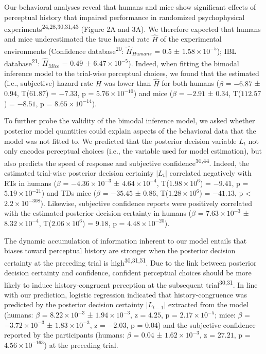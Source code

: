 \documentclass[
]{article}
\begin{document}
Our behavioral analyses reveal that humans and mice show significant
effects of perceptual history that impaired performance in randomized
psychophysical experiments\textsuperscript{24,28,30,31,43} (Figure 2A
and 3A). We therefore expected that humans and mice underestimated the
true hazard rate \(\hat{H}\) of the experimental environments
(Confidence database\textsuperscript{20}: \(\hat{H}_{Humans}\) = \(0.5\)
± \(\ensuremath{1.58\times 10^{-5}}\)); IBL
database\textsuperscript{21}: \(\hat{H}_{Mice}\) = \(0.49\) ±
\(\ensuremath{6.47\times 10^{-5}}\)). Indeed, when fitting the bimodal
inference model to the trial-wise perceptual choices, we found that the
estimated (i.e., subjective) hazard rate \(H\) was lower than
\(\hat{H}\) for both humans (\(\beta\) = \(-6.87\) ± \(0.94\),
T(\(61.87\)) = \(-7.33\), p = \(\ensuremath{5.76\times 10^{-10}}\)) and
mice (\(\beta\) = \(-2.91\) ± \(0.34\), T(\(112.57\)) = \(-8.51\), p =
\(\ensuremath{8.65\times 10^{-14}}\)).

To further probe the validity of the bimodal inference model, we asked
whether posterior model quantities could explain aspects of the
behavioral data that the model was not fitted to. We predicted that the
posterior decision variable \(L_t\) not only encodes perceptual choices
(i.e., the variable used for model estimation), but also predicts the
speed of response and subjective confidence\textsuperscript{30,44}.
Indeed, the estimated trial-wise posterior decision certainty \(|L_t|\)
correlated negatively with RTs in humans (\(\beta\) =
\(\ensuremath{-4.36\times 10^{-3}}\) ±
\(\ensuremath{4.64\times 10^{-4}}\),
T(\(\ensuremath{1.98\times 10^{6}}\)) = \(-9.41\), p =
\(\ensuremath{5.19\times 10^{-21}}\)) and TDs mice (\(\beta\) =
\(-35.45\) ± \(0.86\), T(\(\ensuremath{1.28\times 10^{6}}\)) =
\(-41.13\), p < \(\ensuremath{2.2\times 10^{-308}}\)). Likewise, subjective confidence reports were
positively correlated with the estimated posterior decision certainty in
humans (\(\beta\) = \(\ensuremath{7.63\times 10^{-3}}\) ±
\(\ensuremath{8.32\times 10^{-4}}\),
T(\(\ensuremath{2.06\times 10^{6}}\)) = \(9.18\), p =
\(\ensuremath{4.48\times 10^{-20}}\)).

The dynamic accumulation of information inherent to our model entails
that biases toward perceptual history are stronger when the posterior
decision certainty at the preceding trial is
high\textsuperscript{30,31,51}. Due to the link between posterior
decision certainty and confidence, confident perceptual choices should
be more likely to induce history-congruent perception at the subsequent
trial\textsuperscript{30,31}. In line with our prediction, logistic
regression indicated that history-congruence was predicted by the
posterior decision certainty \(|L_{t-1}|\) extracted from the model
(humans: \(\beta\) = \(\ensuremath{8.22\times 10^{-3}}\) ±
\(\ensuremath{1.94\times 10^{-3}}\), z = \(4.25\), p =
\(\ensuremath{2.17\times 10^{-5}}\); mice: \(\beta\) =
\(\ensuremath{-3.72\times 10^{-3}}\) ±
\(\ensuremath{1.83\times 10^{-3}}\), z = \(-2.03\), p = \(0.04\)) and
the subjective confidence reported by the participants (humans:
\(\beta\) = \(0.04\) ± \(\ensuremath{1.62\times 10^{-3}}\), z =
\(27.21\), p = \(\ensuremath{4.56\times 10^{-163}}\)) at the preceding
trial.
\end{document}
